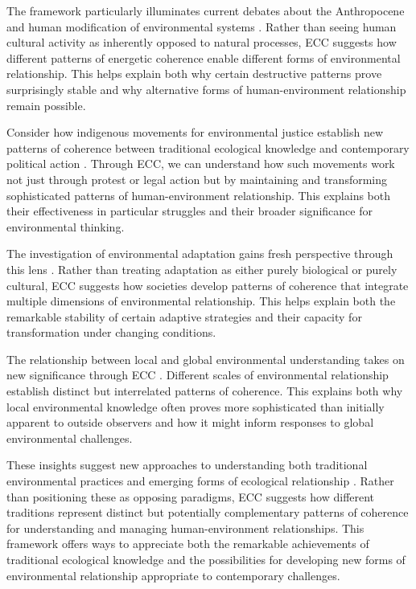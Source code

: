 The framework particularly illuminates current debates about the Anthropocene and human modification of environmental systems \cite{haraway2016staying}. Rather than seeing human cultural activity as inherently opposed to natural processes, ECC suggests how different patterns of energetic coherence enable different forms of environmental relationship. This helps explain both why certain destructive patterns prove surprisingly stable and why alternative forms of human-environment relationship remain possible.

Consider how indigenous movements for environmental justice establish new patterns of coherence between traditional ecological knowledge and contemporary political action \cite{nadasdy2007gift}. Through ECC, we can understand how such movements work not just through protest or legal action but by maintaining and transforming sophisticated patterns of human-environment relationship. This explains both their effectiveness in particular struggles and their broader significance for environmental thinking.

The investigation of environmental adaptation gains fresh perspective through this lens \cite{strathern1980no}. Rather than treating adaptation as either purely biological or purely cultural, ECC suggests how societies develop patterns of coherence that integrate multiple dimensions of environmental relationship. This helps explain both the remarkable stability of certain adaptive strategies and their capacity for transformation under changing conditions.

The relationship between local and global environmental understanding takes on new significance through ECC \cite{tsing2015mushroom}. Different scales of environmental relationship establish distinct but interrelated patterns of coherence. This explains both why local environmental knowledge often proves more sophisticated than initially apparent to outside observers and how it might inform responses to global environmental challenges.

These insights suggest new approaches to understanding both traditional environmental practices and emerging forms of ecological relationship \cite{latour2004politics}. Rather than positioning these as opposing paradigms, ECC suggests how different traditions represent distinct but potentially complementary patterns of coherence for understanding and managing human-environment relationships. This framework offers ways to appreciate both the remarkable achievements of traditional ecological knowledge and the possibilities for developing new forms of environmental relationship appropriate to contemporary challenges.